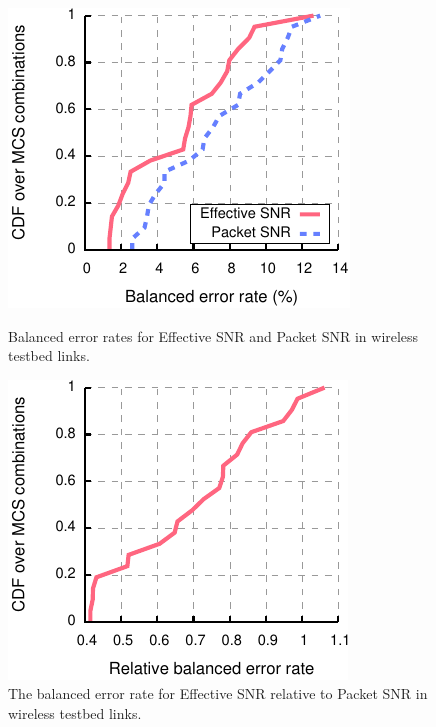 \begin{figure}[t]
  \begin{minipage}{0.48\textwidth}
  \centering
  \includegraphics[width=\textwidth]{figures/delivery_figures/goodbad/error_rates.pdf}
  \caption[Balanced error rates for Effective SNR and Packet SNR]{Balanced error rates for Effective SNR and Packet SNR in wireless testbed links.}
  \label{fig:balanced_error}
  \end{minipage}
  \hfill
  \begin{minipage}{0.48\textwidth}
  \centering
  \includegraphics[width=\textwidth]{figures/delivery_figures/goodbad/error_ratio.pdf}
  \caption[Balanced error rate for Effective SNR relative to Packet SNR]{The balanced error rate for Effective SNR relative to Packet SNR in wireless testbed links.}
  \label{fig:balanced_error_ratio}
  \end{minipage}
\end{figure}


